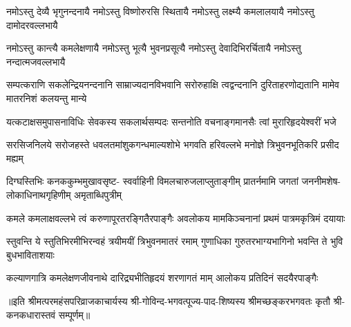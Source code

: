 \fourlineindentedshloka
{नमोऽस्तु देव्यै भृगुनन्दनायै}
{नमोऽस्तु विष्णोरुरसि स्थितायै}
{नमोऽस्तु लक्ष्म्यै कमलालयायै}
{नमोऽस्तु दामोदरवल्लभायै}

\fourlineindentedshloka
{नमोऽस्तु कान्त्यै कमलेक्षणायै}
{नमोऽस्तु भूत्यै भुवनप्रसूत्यै}
{नमोऽस्तु देवादिभिरर्चितायै}
{नमोऽस्तु नन्दात्मजवल्लभायै}

\fourlineindentedshloka
{सम्पत्कराणि सकलेन्द्रियनन्दनानि}
{साम्राज्यदानविभवानि सरोरुहाक्षि}
{त्वद्वन्दनानि दुरिताहरणोद्यतानि}
{मामेव मातरनिशं कलयन्तु मान्ये}

\fourlineindentedshloka
{यत्कटाक्षसमुपासनाविधिः}
{सेवकस्य सकलार्थसम्पदः}
{सन्तनोति वचनाङ्गमानसैः}
{त्वां मुरारिहृदयेश्वरीं भजे}

\fourlineindentedshloka
{सरसिजनिलये सरोजहस्ते}
{धवलतमांशुकगन्धमाल्यशोभे}
{भगवति हरिवल्लभे मनोज्ञे}
{त्रिभुवनभूतिकरि प्रसीद मह्यम्}

\fourlineindentedshloka
{दिग्घस्तिभिः कनककुम्भमुखावसृष्ट-}
{स्वर्वाहिनी विमलचारुजलाप्लुताङ्गीम्}
{प्रातर्नमामि जगतां जननीमशेष-}
{लोकाधिनाथगृहिणीम् अमृताब्धिपुत्रीम्}

\fourlineindentedshloka
{कमले कमलाक्षवल्लभे त्वं}
{करुणापूरतरङ्गितैरपाङ्गैः}
{अवलोकय मामकिञ्चनानां}
{प्रथमं पात्रमकृत्रिमं दयायाः}

\fourlineindentedshloka
{स्तुवन्ति ये स्तुतिभिरमीभिरन्वहं}
{त्रयीमयीं त्रिभुवनमातरं रमाम्}
{गुणाधिका गुरुतरभाग्यभागिनो}
{भवन्ति ते भुवि बुधभाविताशयाः}

{कल्याणगात्रि कमलेक्षणजीवनाथे}
{दारिद्र्यभीतिहृदयं शरणागतं माम्}
{आलोकय प्रतिदिनं सदयैरपाङ्गैः}

॥इति  श्रीमत्परमहंसपरिव्राजकाचार्यस्य श्री-गोविन्द-भगवत्पूज्य-पाद-शिष्यस्य
श्रीमच्छङ्करभगवतः कृतौ श्री-कनकधारास्तवं सम्पूर्णम्॥